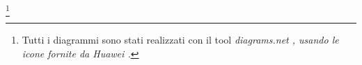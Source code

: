 \documentclass[11pt,oneside,openright,a4paper]{book}
\begin{document}
\frontmatter
\begin{singlespace}
  
  \begin{doublespace}
    
  \end{doublespace}

  \tableofcontents 

  \listoffigures

  \footnote[]{Tutti i diagrammi sono stati realizzati con il tool \it{diagrams.net} \cite{drawio}, usando le icone fornite da Huawei \cite{icons}.}

\end{singlespace}

\mainmatter


















\begin{singlespace}
		
  \clearpage

  
\end{singlespace}


%
\end{document}
